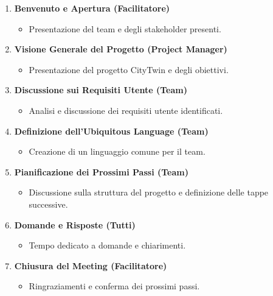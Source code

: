 \begin{enumerate}
    \item \textbf{Benvenuto e Apertura (Facilitatore)}
          \begin{itemize}
              \item Presentazione del team e degli stakeholder presenti.
          \end{itemize}

    \item \textbf{Visione Generale del Progetto (Project Manager)}
          \begin{itemize}
              \item Presentazione del progetto CityTwin e degli obiettivi.
          \end{itemize}

    \item \textbf{Discussione sui Requisiti Utente (Team)}
          \begin{itemize}
              \item Analisi e discussione dei requisiti utente identificati.
          \end{itemize}

    \item \textbf{Definizione dell'Ubiquitous Language (Team)}
          \begin{itemize}
              \item Creazione di un linguaggio comune per il team.
          \end{itemize}

    \item \textbf{Pianificazione dei Prossimi Passi (Team)}
          \begin{itemize}
              \item Discussione sulla struttura del progetto e definizione delle tappe successive.
          \end{itemize}

    \item \textbf{Domande e Risposte (Tutti)}
          \begin{itemize}
              \item Tempo dedicato a domande e chiarimenti.
          \end{itemize}

    \item \textbf{Chiusura del Meeting (Facilitatore)}
          \begin{itemize}
              \item Ringraziamenti e conferma dei prossimi passi.
          \end{itemize}
\end{enumerate}

